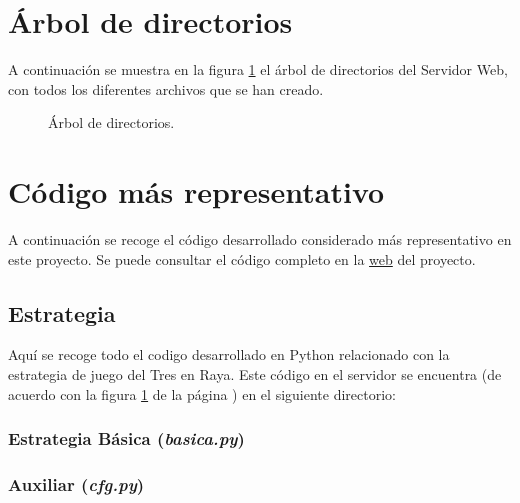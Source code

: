 

\section{Árbol de directorios}

A continuación se muestra en la figura \ref{fig:directorios} el árbol de
directorios del Servidor Web, con todos los diferentes archivos que se han
creado. \\

\begin{figure}[H]
  \centering
  \scalebox{.93}{}
  \caption{Árbol de directorios.}
  \label{fig:directorios}
\end{figure}


\section{Código más representativo}

A continuación se recoge el código desarrollado considerado más representativo
en este proyecto. Se puede consultar el código completo en la
\href{https://alvarezrosa.com/proyecto/proyecto/}{web} del proyecto.

\subsection{Estrategia} \label{sec:cod_est}
Aquí se recoge todo el codigo desarrollado en Python 
relacionado con la estrategia de juego del Tres en Raya. Este código en el
servidor se encuentra (de acuerdo con la figura \ref{fig:directorios} de la
página \pageref{fig:directorios}) en el siguiente directorio: \\


\subsubsection*{Estrategia Básica (\textit{basica.py})}
\subsubsection*{Auxiliar (\textit{cfg.py})}

